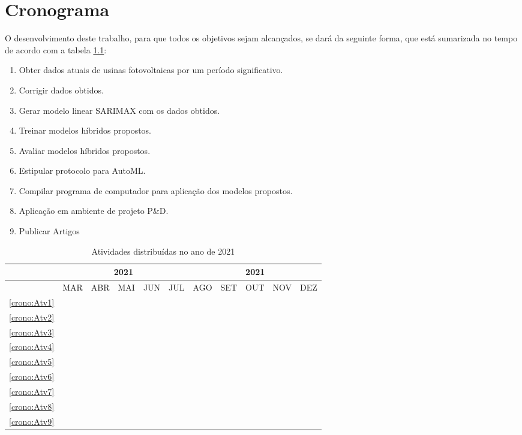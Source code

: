 \chapter{Cronograma}
\label{cap:cronograma}

O desenvolvimento deste trabalho, para que todos os objetivos sejam alcançados, se dará da seguinte forma, que está sumarizada no tempo de acordo com a tabela \ref{tab:cronograma}:

\begin{enumerate}
	\item \label{crono:Atv1} Obter dados atuais de usinas fotovoltaicas por um período significativo.
	\item \label{crono:Atv2} Corrigir dados obtidos.
	\item \label{crono:Atv3} Gerar modelo linear SARIMAX com os dados obtidos.
	\item \label{crono:Atv4} Treinar modelos híbridos propostos. 
	\item \label{crono:Atv5} Avaliar modelos híbridos propostos.
	\item \label{crono:Atv6} Estipular protocolo para AutoML.
	\item \label{crono:Atv7} Compilar programa de computador para aplicação dos modelos propostos.
	\item \label{crono:Atv8} Aplicação em ambiente de projeto P\&D.
	\item \label{crono:Atv9} Publicar Artigos
\end{enumerate}

\begin{table}[h]
\caption{Atividades distribuídas no ano de 2021} 
\label{tab:cronograma}
\centering
	\begin{tabular}{|c|c|c|c|c|c|c|c|c|c|c|}
		\hline
		&\multicolumn{5}{c|}{2021}&\multicolumn{5}{c|}{2021}\\
		\hline
		&MAR&ABR&MAI&JUN&JUL&AGO&SET&OUT&NOV&DEZ\\
		\hline
		\ref{crono:Atv1}&\cellcolor{midgray}&\cellcolor{midgray}&&&&&&&&\\
		\hline
		\ref{crono:Atv2}&&&\cellcolor{midgray}&\cellcolor{midgray}&&&&&&\\
		\hline	
		\ref{crono:Atv3}&&&\cellcolor{midgray}&\cellcolor{midgray}&&&&&&\\
		\hline			
		\ref{crono:Atv4}&&&&\cellcolor{midgray}&\cellcolor{midgray}&&&&&\\
		\hline	
		\ref{crono:Atv5}&&&&\cellcolor{midgray}&\cellcolor{midgray}&&&&&\\
		\hline
		\ref{crono:Atv6}&&&&&\cellcolor{midgray}&\cellcolor{midgray}&&&&\\
		\hline	
		\ref{crono:Atv7}&&&&&&\cellcolor{midgray}&\cellcolor{midgray}&&&\\
		\hline
		\ref{crono:Atv8}&&&&&&&\cellcolor{midgray}&\cellcolor{midgray}&\cellcolor{midgray}&\\
		\hline
		\ref{crono:Atv9}&&&&&&&&&\cellcolor{midgray}&\cellcolor{midgray}\\
		\hline
	\end{tabular}
\end{table}